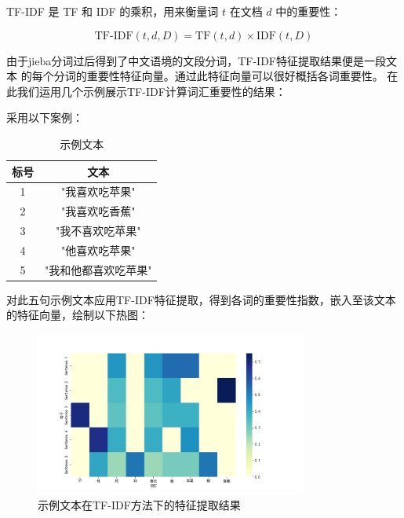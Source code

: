 \documentclass[UTF8,a4paper,15pt,titlepage,oneside]{ctexbook}
\begin{document}
TF-IDF 是 TF 和 IDF 的乘积，用来衡量词 $t$ 在文档 $d$ 中的重要性：

\begin{equation}
\text{TF-IDF}(t, d, D) = \text{TF}(t, d) \times \text{IDF}(t, D)
\end{equation}

由于jieba分词过后得到了中文语境的文段分词，TF-IDF特征提取结果便是一段文本
的每个分词的重要性特征向量。通过此特征向量可以很好概括各词重要性。
在此我们运用几个示例展示TF-IDF计算词汇重要性的结果：

采用以下案例：
\begin{table}[H]
  \centering
  \begin{tabular}{cc}
  \toprule
  标号 & 文本\\
  \midrule
  1 & "我喜欢吃苹果"\\
  2 & "我喜欢吃香蕉"\\
  3 & "我不喜欢吃苹果"\\
  4 & "他喜欢吃苹果"\\
  5 & "我和他都喜欢吃苹果"\\
  \bottomrule
  \end{tabular}
  \caption{示例文本}
  \end{table}

对此五句示例文本应用TF-IDF特征提取，得到各词的重要性指数，嵌入至该文本的特征向量，绘制以下热图：

  \begin{figure}[H]
    \centering
    \includegraphics[width=0.8\textwidth,keepaspectratio=false]{pictures/1.png} %
    \caption{示例文本在TF-IDF方法下的特征提取结果}
    
  \end{figure}
\end{document}
